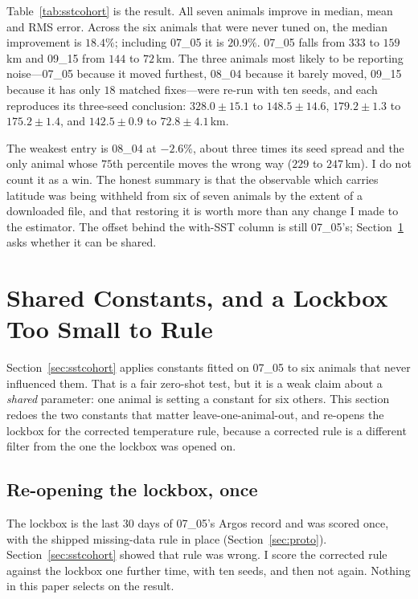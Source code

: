 \documentclass[conference]{IEEEtran}
\begin{document}
Table~\ref{tab:sstcohort} is the result. All seven animals improve in median,
mean and RMS error. Across the six animals that were never tuned on, the median
improvement is $18.4\%$; including 07\_05 it is $20.9\%$. 07\_05 falls from
$333$ to $159$\,\si{\km} and 09\_15 from $144$ to $72$\,\si{\km}. The three
animals most likely to be reporting noise---07\_05 because it moved furthest,
08\_04 because it barely moved, 09\_15 because it has only $18$ matched
fixes---were re-run with ten seeds, and each reproduces its three-seed
conclusion: $328.0 \pm 15.1$ to $148.5 \pm 14.6$, $179.2 \pm 1.3$ to
$175.2 \pm 1.4$, and $142.5 \pm 0.9$ to $72.8 \pm 4.1$\,\si{\km}.

The weakest entry is 08\_04 at $-2.6\%$, about three times its seed spread and
the only animal whose $75$th percentile moves the wrong way ($229$ to
$247$\,\si{\km}). I do not count it as a win. The honest summary is that the
observable which carries latitude was being withheld from six of seven animals
by the extent of a downloaded file, and that restoring it is worth more than
any change I made to the estimator. The offset behind the with-SST column is
still 07\_05's; Section~\ref{sec:pool} asks whether it can be shared.

\section{Shared Constants, and a Lockbox Too Small to Rule}
\label{sec:pool}
Section~\ref{sec:sstcohort} applies constants fitted on 07\_05 to six animals
that never influenced them. That is a fair zero-shot test, but it is a weak
claim about a \emph{shared} parameter: one animal is setting a constant for six
others. This section redoes the two constants that matter leave-one-animal-out,
and re-opens the lockbox for the corrected temperature rule, because a corrected
rule is a different filter from the one the lockbox was opened on.

\subsection{Re-opening the lockbox, once}
The lockbox is the last $30$ days of 07\_05's Argos record and was scored once,
with the shipped missing-data rule in place (Section~\ref{sec:proto}).
Section~\ref{sec:sstcohort} showed that rule was wrong. I score the corrected
rule against the lockbox one further time, with ten seeds, and then not again.
Nothing in this paper selects on the result.
\end{document}

